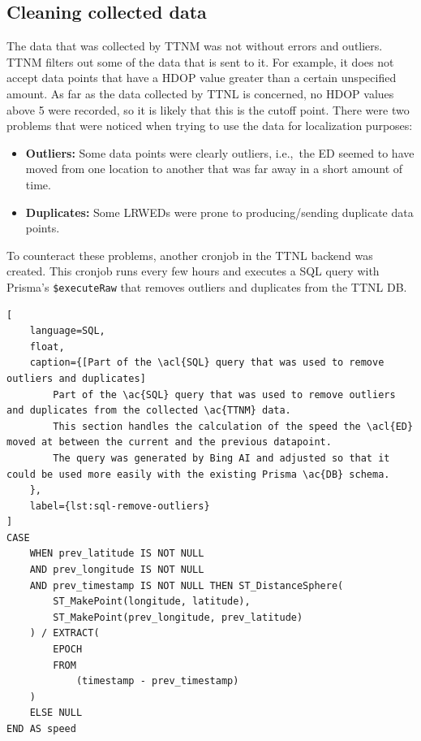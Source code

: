 \subsection{Cleaning collected data}\label{subsec:cleaning-collected-data}

The data that was collected by \ac{TTNM} was not without errors and outliers.
\ac{TTNM} filters out some of the data that is sent to it.
For example, it does not accept data points that have a \ac{HDOP} value greater than a certain unspecified amount.
As far as the data collected by \ac{TTNL} is concerned, no \ac{HDOP} values above 5 were recorded, so it is likely that this is the cutoff point.
There were two problems that were noticed when trying to use the data for localization purposes:

\begin{itemize}
    \item \textbf{Outliers:} Some data points were clearly outliers, i.e.,\ the \acl{ED} seemed to have moved from one location to another that was far away in a short amount of time.
    \item \textbf{Duplicates:} Some \aclp{LRWED} were prone to producing/sending duplicate data points.
\end{itemize}

To counteract these problems, another cronjob in the \ac{TTNL} backend was created.
This cronjob runs every few hours and executes a \ac{SQL} query with Prisma's \lstinline|$executeRaw| that removes outliers and duplicates from the \ac{TTNL} \ac{DB}.

\begin{lstlisting}[
    language=SQL,
    float,
    caption={[Part of the \acl{SQL} query that was used to remove outliers and duplicates]
        Part of the \ac{SQL} query that was used to remove outliers and duplicates from the collected \ac{TTNM} data.
        This section handles the calculation of the speed the \acl{ED} moved at between the current and the previous datapoint.
        The query was generated by Bing AI and adjusted so that it could be used more easily with the existing Prisma \ac{DB} schema.
    },
    label={lst:sql-remove-outliers}
]
CASE
    WHEN prev_latitude IS NOT NULL
    AND prev_longitude IS NOT NULL
    AND prev_timestamp IS NOT NULL THEN ST_DistanceSphere(
        ST_MakePoint(longitude, latitude),
        ST_MakePoint(prev_longitude, prev_latitude)
    ) / EXTRACT(
        EPOCH
        FROM
            (timestamp - prev_timestamp)
    )
    ELSE NULL
END AS speed
\end{lstlisting}


